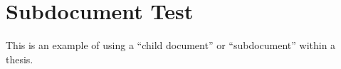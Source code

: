 \chapter{Subdocument Test}

This is an example of using a ``child document'' or ``subdocument'' within a thesis.
